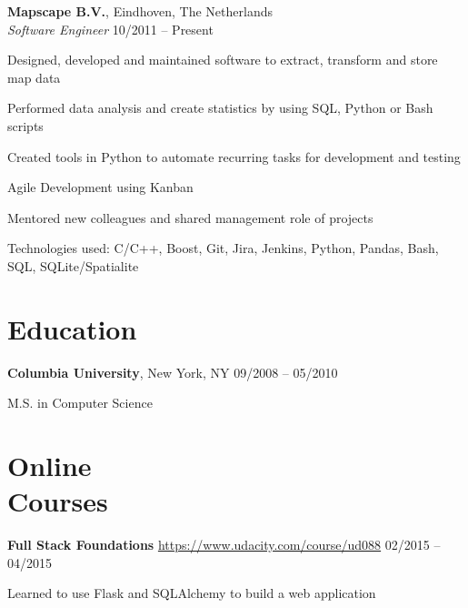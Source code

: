 \documentclass[margin,line]{resume}
\begin{document}
\begin{resume}
    \textbf{Mapscape B.V.}, Eindhoven, The Netherlands \\
    \textsl{Software Engineer} \hfill 10/2011 -- Present \vspace{-3mm}\\\vspace{-1mm}%
      \begin{list2}
      \item Designed, developed and maintained software to extract, transform and store map data
      \item Performed data analysis and create statistics by using SQL, Python or Bash scripts
      \item Created tools in Python to automate recurring tasks for development and testing
      \item Agile Development using Kanban
      \item Mentored new colleagues and shared management role of projects
      \item Technologies used: C/C++, Boost, Git, Jira, Jenkins, Python, Pandas, Bash, SQL, SQLite/Spatialite
      \end{list2}

    \section{\myheadingstyle Education}

    \textbf{Columbia University}, New York, NY \hfill 09/2008 -- 05/2010 \vspace{-3mm}\\\vspace{-1mm}%
      \begin{list2}
       \item M.S. in Computer Science
      \end{list2}
    \vspace{-1mm}
 
    \section{\myheadingstyle Online \\ Courses}

    \textbf{Full Stack Foundations} \url{https://www.udacity.com/course/ud088} \hfill 02/2015 -- 04/2015 \vspace{-3mm}\\\vspace{-1mm}%
      \begin{list2}
       \item Learned to use Flask and SQLAlchemy to build a web application
      \end{list2}
    \vspace{-2mm}


\end{resume}
\end{document}
